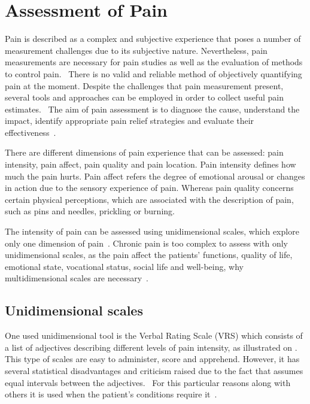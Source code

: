 \section{Assessment of Pain}
Pain is described as a complex and subjective experience that poses a number of measurement challenges due to its subjective nature. Nevertheless, pain measurements are necessary for pain studies as well as the evaluation of methods to control pain.~\cite{Jensen2001} There is no valid and reliable method of objectively quantifying pain at the moment. Despite the challenges that pain measurement present, several tools and approaches can be employed in order to collect useful pain estimates.~\cite{Younger2010} The aim of pain assessment is to diagnose the cause, understand the impact, identify appropriate pain relief strategies and evaluate their effectiveness~\cite{Briggs2010}.

There are different dimensions of pain experience that can be assessed: pain intensity, pain affect, pain quality and pain location. Pain intensity defines how much the pain hurts. %
Pain affect refers the degree of emotional arousal or changes in action due to the sensory experience of pain. Whereas pain quality concerns certain physical perceptions, which are associated with the description of pain, such as pins and needles, prickling or burning.  

The intensity of pain can be assessed using unidimensional scales, which explore only one dimension of pain~\cite{Jensen2001}. %
Chronic pain is too complex to assess with only unidimensional scales, as the pain affect the patients' functions, quality of life, emotional state, vocational status, social life and well-being, why multidimensional scales are necessary~\cite{Ebert2010}. 


\subsection{Unidimensional scales}
One used unidimensional tool is the Verbal Rating Scale (VRS) which consists of a list of adjectives describing different levels of pain intensity, as illustrated on . This type of scales are easy to administer, score and apprehend. However, it has several statistical disadvantages and criticism raised due to the fact that assumes equal intervals between the adjectives.~\cite{Jensen2001} For this particular reasons along with others it is used when the patient's conditions require it~\cite{Jensen1986}. 

